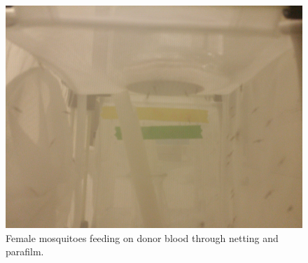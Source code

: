 \documentclass{article}
\begin{document}
\begin{figure}[p]
\includegraphics[scale=0.1, angle=180]{feedingmozzies}
\caption{Female mosquitoes feeding on donor blood through netting and parafilm.}
\end{figure}
\end{document}
